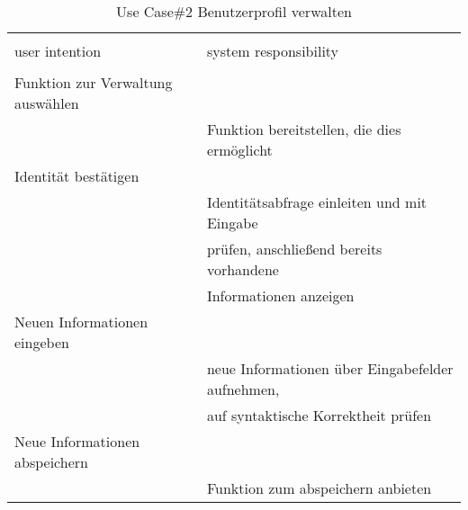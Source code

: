 \begin{table}[H]
\caption{Use Case\#2 Benutzerprofil verwalten }
\centering
\begin{tabular}{l l}
\\ [-0.5ex]

\hline\hline
\\ [-0.5ex]
user intention & system responsibility
\\ [1.5ex]
\hline
\\ [-0.5ex]
Funktion zur Verwaltung auswählen  	& 												 	\\[1ex]
									& Funktion bereitstellen, die dies ermöglicht	 	\\[1ex]
Identität bestätigen				& 											     	\\[1ex]
									& Identitätsabfrage einleiten und mit Eingabe    	\\[1ex]
									& prüfen, anschließend bereits vorhandene 		 	\\[1ex] 
									& Informationen anzeigen     				     	\\[1ex] 
Neuen Informationen eingeben 		& 											     	\\[1ex] 
									& neue Informationen über Eingabefelder aufnehmen, 	\\[1ex]
									& auf syntaktische Korrektheit prüfen				\\[1ex]
Neue Informationen abspeichern		& 											 		\\[1ex]
									& Funktion zum abspeichern anbieten					\\[1ex]
\hline
\end{tabular}
\label{tab:profilbearbeitenUC}
\end{table}

